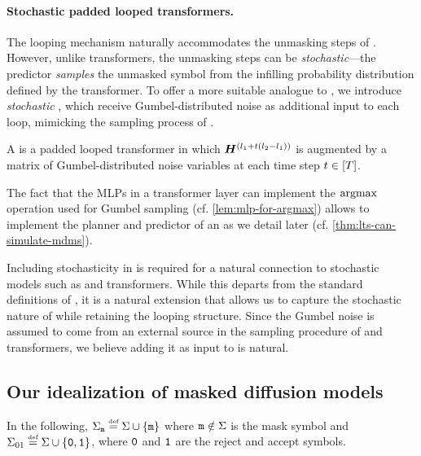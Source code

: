 \paragraph{Stochastic padded looped transformers.}
The looping mechanism naturally accommodates the unmasking steps of \MDMsAcr.
However, unlike \LTAcr transformers, the \MDMAcr unmasking steps can be \emph{stochastic}---the predictor \emph{samples} the unmasked symbol from the infilling probability distribution defined by the transformer.
To offer a more suitable analogue to \MDMsAcr, we introduce \emph{stochastic} \LTsAcr, which receive Gumbel-distributed noise as additional input to each loop, mimicking the sampling process of \MDMsAcr.
\begin{definition} \label{def:stochastic-looped-transformer}
   A  is a padded looped transformer in which ${{{{{\bm{H}}}}}}^{({{l}}_1 + t({{l}}_2 - {{l}}_1))}$ is augmented by a matrix of Gumbel-distributed noise variables at each time step $t \in {\left[ {T}\right]}$.
\end{definition}
The fact that the MLPs in a transformer layer can implement the $\operatorname*{{{argmax}}}$ operation used for Gumbel sampling (cf. \cref{lem:mlp-for-argmax}) allows \LTsAcr to implement the planner and predictor of an \MDMAcr as we detail later (cf. \cref{thm:lts-can-simulate-mdms}).

Including stochasticity in \LTsAcr is required for a natural connection to stochastic models such as \MDMsAcr and \CoTAcr transformers.
While this departs from the standard definitions of \LTsAcr, it is a natural extension that allows us to capture the stochastic nature of \MDMsAcr while retaining the looping structure.
Since the Gumbel noise is assumed to come from an external source in the sampling procedure of \MDMsAcr and \CoTAcr transformers, we believe adding it as input to \LTsAcr is natural.


\subsection{Our idealization of masked diffusion models} \label{app:idealization}

In the following, ${{{\Sigma}}_{{\texttt{m}}}} \mathrel{\stackrel{\textnormal{\tiny def}}{=}} {{\Sigma}} \cup \{{\texttt{m}}\}$ where ${\texttt{m}} \notin {{\Sigma}}$ is the mask symbol and ${{{\Sigma}}_{01}} \mathrel{\stackrel{\textnormal{\tiny def}}{=}} {{\Sigma}} \cup \{{\texttt{0}}, {\texttt{1}}\}$, where ${\texttt{0}}$ and ${\texttt{1}}$ are the reject and accept symbols.

